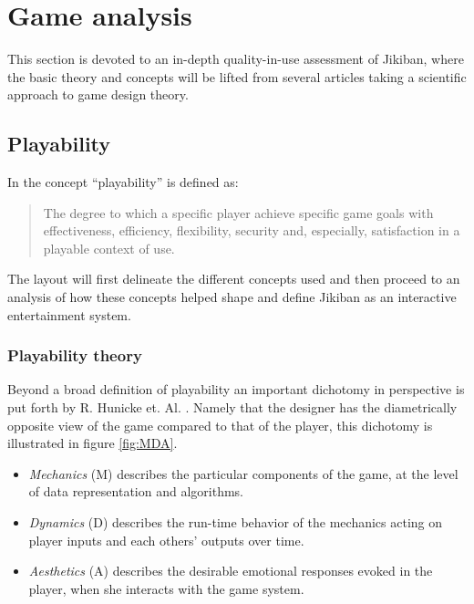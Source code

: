 \section{Game analysis}
This section is devoted to an in-depth quality-in-use assessment of
Jikiban, where the basic theory and concepts will be lifted from
several articles taking a scientific approach to game design theory.

\subsection{Playability}
In \cite{sanchez09} the concept ``playability'' is defined as:

\begin{quotation}
The degree to which a specific player achieve specific game goals with
effectiveness, efficiency, flexibility, security and, especially,
satisfaction in a playable context of use.
\end{quotation}

The layout will first delineate the different concepts used and then
proceed to an analysis of how these concepts helped shape and define
Jikiban as an interactive entertainment system.


\subsubsection{Playability theory}
Beyond a broad definition of playability an important dichotomy in
perspective is put forth by R. Hunicke
et. Al. \cite{hunicke01-04}. Namely that the designer has the
diametrically opposite view of the game compared to that of the
player, this dichotomy is illustrated in figure \ref{fig:MDA}.

\begin{itemize}
\item \emph{Mechanics} (M) describes the particular components of the game, at
  the level of data representation and algorithms.
\item \emph{Dynamics} (D) describes the run-time behavior of the mechanics
  acting on player inputs and each others’ outputs over time.
\item \emph{Aesthetics} (A) describes the desirable emotional responses evoked
  in the player, when she interacts with the game system.
\end{itemize}





